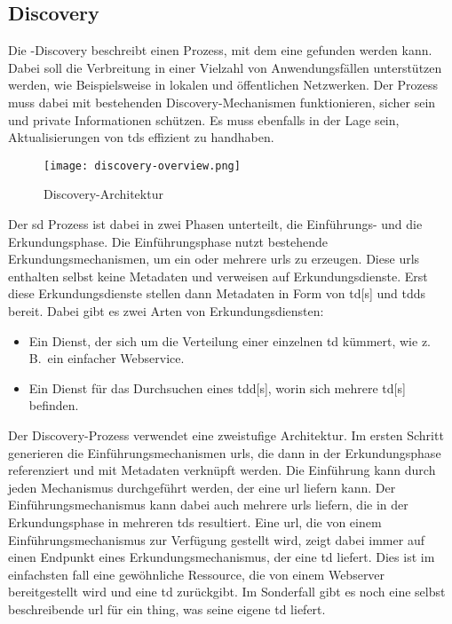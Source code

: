 \subsection{Discovery}\label{subsec:wotdiscovery}

Die -Discovery beschreibt einen Prozess, mit dem eine  gefunden werden kann.
Dabei soll die Verbreitung in einer Vielzahl von Anwendungsfällen unterstützen werden, wie Beispielsweise in lokalen und öffentlichen Netzwerken.
Der Prozess muss dabei mit bestehenden Discovery-Mechanismen funktionieren, sicher sein und private Informationen schützen.
Es muss ebenfalls in der Lage sein, Aktualisierungen von \glspl{td} effizient zu handhaben.

\begin{figure}[H]
    \centering
    \texttt{[image: discovery-overview.png]}
    \caption{Discovery-Architektur}\label{fig:discovery_overview}
\end{figure}

Der \gls{sd} Prozess ist dabei in zwei Phasen unterteilt, die Einführungs- und die Erkundungsphase.
Die Einführungsphase nutzt bestehende Erkundungsmechanismen, um ein oder mehrere \glspl{url} zu erzeugen.
Diese \glspl{url} enthalten selbst keine Metadaten und verweisen auf Erkundungsdienste.
Erst diese Erkundungsdienste stellen dann Metadaten in Form von \gls{td}[s] und \glspl{tdd} bereit.
Dabei gibt es zwei Arten von Erkundungsdiensten:

\begin{itemize}
    \item Ein Dienst, der sich um die Verteilung einer einzelnen \gls{td} kümmert, wie z.\,B.\ ein einfacher Webservice.
    \item Ein Dienst für das Durchsuchen eines \gls{tdd}[s], worin sich mehrere \gls{td}[s] befinden.
\end{itemize}

Der Discovery-Prozess verwendet eine zweistufige Architektur.
Im ersten Schritt generieren die Einführungsmechanismen \glspl{url}, die dann in der Erkundungsphase referenziert und mit Metadaten verknüpft werden.
Die Einführung kann durch jeden Mechanismus durchgeführt werden, der eine \gls{url} liefern kann.
Der Einführungsmechanismus kann dabei auch mehrere \glspl{url} liefern, die in der Erkundungsphase in mehreren \glspl{td} resultiert.
Eine \gls{url}, die von einem Einführungsmechanismus zur Verfügung gestellt wird, zeigt dabei immer auf einen Endpunkt eines Erkundungsmechanismus, der eine \gls{td} liefert.
Dies ist im einfachsten fall eine gewöhnliche Ressource, die von einem Webserver bereitgestellt wird und eine \gls{td} zurückgibt.
Im Sonderfall gibt es noch eine selbst beschreibende \gls{url} für ein \gls{thing}, was seine eigene \gls{td} liefert.


